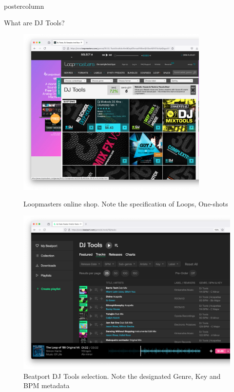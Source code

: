 \documentclass{beamer}
\begin{document}
\begin{frame}
\begin{columns}
\begin{column}{.43\textwidth}
\begin{beamercolorbox}[center]{postercolumn}
\begin{minipage}{.98\textwidth}
{\begin{myblock}{What are DJ Tools?}
			            \begin{figure}
			              \begin{minipage}{0.43\textwidth}
			                \centering\includegraphics[width=0.85\textwidth]{img/loopmasters_djtools.png}
			                \caption{Loopmasters online shop. Note the specification of Loops, One-shots}
			              \end{minipage}
			              \hspace{1em}
			              \begin{minipage}{0.45\textwidth}
			                \centering\includegraphics[width=1\textwidth]{img/beatport_djtools.png}
			                \caption{Beatport DJ Tools selection. Note the designated Genre, Key and BPM metadata}
			              \end{minipage}
			            \end{figure}
					\end{myblock}\vfill
					
}
\end{minipage}
\end{beamercolorbox}
\end{column}
\end{columns}
\end{frame}
\end{document}
